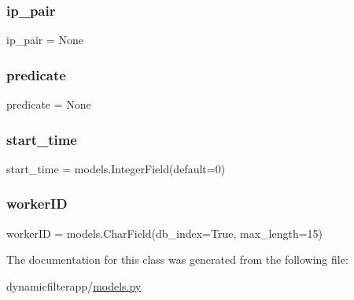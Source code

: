 \subsubsection{\texorpdfstring{ip\_pair}{ip\_pair}}
{\footnotesize\ttfamily ip\+\_\+pair = None\hspace{0.3cm}{\ttfamily [static]}}

\mbox{\label{classdynamicfilterapp_1_1models_1_1_dummy_task_a59edc4e3874fffd0c2a9ef88cddfc0fa}} 
\subsubsection{\texorpdfstring{predicate}{predicate}}
{\footnotesize\ttfamily predicate = None\hspace{0.3cm}{\ttfamily [static]}}

\mbox{\label{classdynamicfilterapp_1_1models_1_1_dummy_task_a2530c3908f0179486a4c2255f792e27a}} 
\subsubsection{\texorpdfstring{start\_time}{start\_time}}
{\footnotesize\ttfamily start\+\_\+time = models.\+Integer\+Field(default=0)\hspace{0.3cm}{\ttfamily [static]}}

\mbox{\label{classdynamicfilterapp_1_1models_1_1_dummy_task_ab569d6674e112f916cbe81a2304d418f}} 
\subsubsection{\texorpdfstring{workerID}{workerID}}
{\footnotesize\ttfamily worker\+ID = models.\+Char\+Field(db\+\_\+index=True, max\+\_\+length=15)\hspace{0.3cm}{\ttfamily [static]}}



The documentation for this class was generated from the following file\+:\begin{DoxyCompactItemize}
\item 
dynamicfilterapp/\mbox{\hyperlink{models_8py}{models.\+py}}\end{DoxyCompactItemize}
